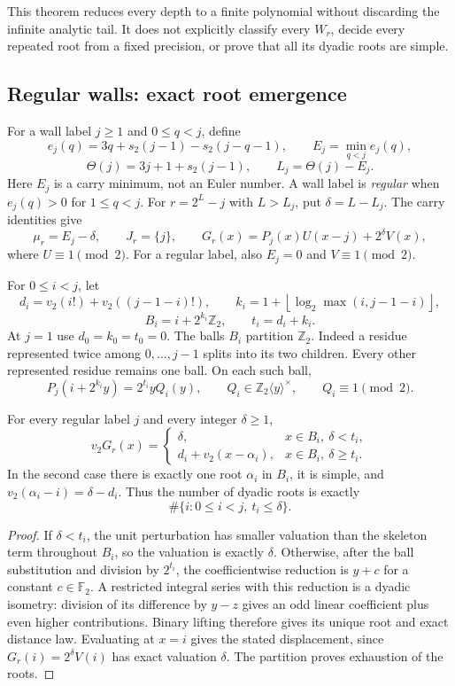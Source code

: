 This theorem reduces every depth to a finite polynomial without discarding
the infinite analytic tail. It does not explicitly classify every
$W_r$, decide every repeated root from a fixed precision, or prove that
all its dyadic roots are simple.

\subsection{Regular walls: exact root emergence}
\label{app:root:regular}

For a wall label $j\ge1$ and $0\le q<j$, define
\[
 e_j(q)=3q+s_2(j-1)-s_2(j-q-1),\qquad
 E_j=\min_{q<j}e_j(q),
\]
\[
 \Theta(j)=3j+1+s_2(j-1),\qquad L_j=\Theta(j)-E_j.
\]
Here $E_j$ is a carry minimum, not an Euler number. A wall label is
\emph{regular} when $e_j(q)>0$ for $1\le q<j$.
For $r=2^L-j$ with $L>L_j$, put $\delta=L-L_j$.
The carry identities give
\[
 \mu_r=E_j-\delta,\qquad J_r=\{j\},\qquad
 G_r(x)=P_j(x)U(x-j)+2^\delta V(x),
\]
where $U\equiv1\pmod2$. For a regular label, also
$E_j=0$ and $V\equiv1\pmod2$.

For $0\le i<j$, let
\[
 d_i=v_2(i!)+v_2((j-1-i)!),\qquad
 k_i=1+\left\lfloor\log_2\max(i,j-1-i)\right\rfloor,
\]
\[
 B_i=i+2^{k_i}\mathbb Z_2,\qquad t_i=d_i+k_i.
\]
At $j=1$ use $d_0=k_0=t_0=0$. The balls $B_i$ partition
$\mathbb Z_2$. Indeed a residue represented twice among $0,\ldots,j-1$
splits into its two children. Every other represented residue remains
one ball. On each such ball,
\[
 P_j(i+2^{k_i}y)=2^{t_i}yQ_i(y),\qquad
 Q_i\in\mathbb Z_2\langle y\rangle^\times,
 \qquad Q_i\equiv1\pmod2.
\]

\begin{theorem}
For every regular label $j$ and every integer $\delta\ge1$,
\[
 v_2G_r(x)=
 \begin{cases}
  \delta,&x\in B_i,\ \delta<t_i,\\
  d_i+v_2(x-\alpha_i),&x\in B_i,\ \delta\ge t_i.
 \end{cases}
\]
In the second case there is exactly one root $\alpha_i$ in $B_i$,
it is simple, and $v_2(\alpha_i-i)=\delta-d_i$.
Thus the number of dyadic roots is exactly
\[
 \#\{i:0\le i<j,\ t_i\le\delta\}.
\]
\label{thm:root:regular}
\end{theorem}
\begin{proof}
If $\delta<t_i$, the unit perturbation has smaller valuation than
the skeleton term throughout $B_i$, so the valuation is exactly
$\delta$. Otherwise, after the ball substitution and division by
$2^{t_i}$, the coefficientwise reduction is $y+c$ for a constant
$c\in\mathbb F_2$. A restricted integral series with this reduction
is a dyadic isometry: division of its difference by $y-z$ gives an
odd linear coefficient plus even higher contributions. Binary lifting
therefore gives its unique root and exact distance law. Evaluating at
$x=i$ gives the stated displacement, since
$G_r(i)=2^\delta V(i)$ has exact valuation $\delta$.
The partition proves exhaustion of the roots.
\end{proof}

